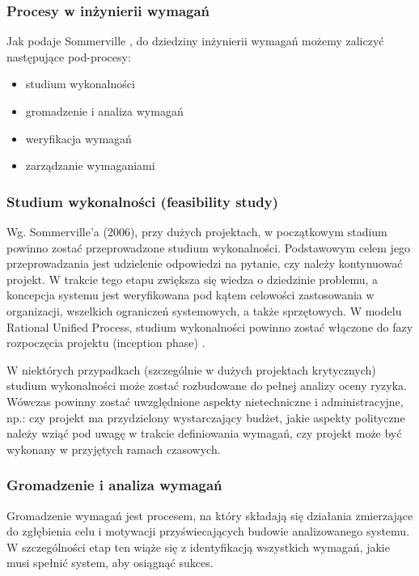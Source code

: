       \subsubsection{Procesy w inżynierii wymagań}

      Jak podaje Sommerville \cite{Somm06}, do dziedziny inżynierii wymagań możemy zaliczyć następujące pod-procesy:

      \begin{itemize} 
          \item studium wykonalności 
          \item gromadzenie i analiza wymagań
          \item weryfikacja wymagań
          \item zarządzanie wymaganiami
      \end{itemize}

      \subsubsection{Studium wykonalności (feasibility study)}

        Wg. Sommerville'a (2006), przy dużych projektach, w początkowym stadium powinno zostać przeprowadzone studium wykonalności. Podstawowym celem jego przeprowadzania jest udzielenie odpowiedzi na pytanie, czy należy kontynuować projekt. W trakcie tego etapu zwiększa się wiedza o dziedzinie problemu, a koncepcja systemu jest weryfikowana pod kątem celowości zastosowania w organizacji, wszelkich ograniczeń systemowych, a także sprzętowych. W modelu Rational Unified Process, studium wykonalności powinno zostać włączone do fazy rozpoczęcia projektu (inception phase) \cite{Kruch03}.

        W niektórych przypadkach (szczególnie w dużych projektach krytycznych) studium wykonalności może zostać rozbudowane do pełnej analizy oceny ryzyka. Wówczas powinny zostać uwzględnione aspekty nietechniczne i administracyjne, np.: czy projekt ma przydzielony wystarczający budżet, jakie aspekty polityczne należy wziąć pod uwagę w trakcie definiowania wymagań, czy projekt może być wykonany w przyjętych ramach czasowych.

      \subsubsection{Gromadzenie i analiza wymagań}

        Gromadzenie wymagań jest procesem, na który składają się działania zmierzające do zgłębienia celu i motywacji przyświecających budowie analizowanego systemu. W szczególności etap ten wiąże się z identyfikacją wszystkich wymagań, jakie musi spełnić system, aby osiągnąć sukces.
        
